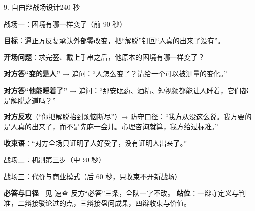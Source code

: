 \documentclass[script,con]{debate}
\begin{document}
\begin{stage}{9. 自由辩战场设计}{240 秒}
\begin{battleground}{战场一：困境有哪一样变了（前 90 秒）}
\begin{bullets}
\item \textbf{目标}：逼正方反复承认外部零改变，把“解脱”钉回“人真的出来了没有”。
\item \textbf{开场问题}：求完签、戴上手串之后，他原本的困境有哪一样变了？
\item \textbf{对方答“变的是人”} → 追问：“人怎么变了？请给一个可以被测量的变化。”
\item \textbf{对方答“他能睡着了”} → 追问：“那安眠药、酒精、短视频都能让人睡着，它们都是解脱之道吗？”
\item \textbf{对方反攻}（“你把解脱抬到烦恼断尽”）→ 防守口径：“我方从没这么说。我方要的是人真的出来了，而不是先麻一会儿。心理咨询就算，我方给过标准。”
\item \textbf{收束语}：“对方全场只证明了人好受了，没有证明人出来了。”
\end{bullets}
\end{battleground}
\begin{battleground}{战场二：机制第三步（中 90 秒）}
\begin{fields}
\end{fields}
\end{battleground}
\begin{battleground}{战场三：代价与商业模式（后 60 秒，只收束不开新战场）}
\begin{fields}
\end{fields}
\textbf{必答与口径}：见 速查-反方“必答”三条，全队一字不改。
\textbf{站位}：一辩守定义与判准，二辩接驳论过的点，三辩接盘问成果，四辩收束与价值。
\end{battleground}
\end{stage}
\end{document}

